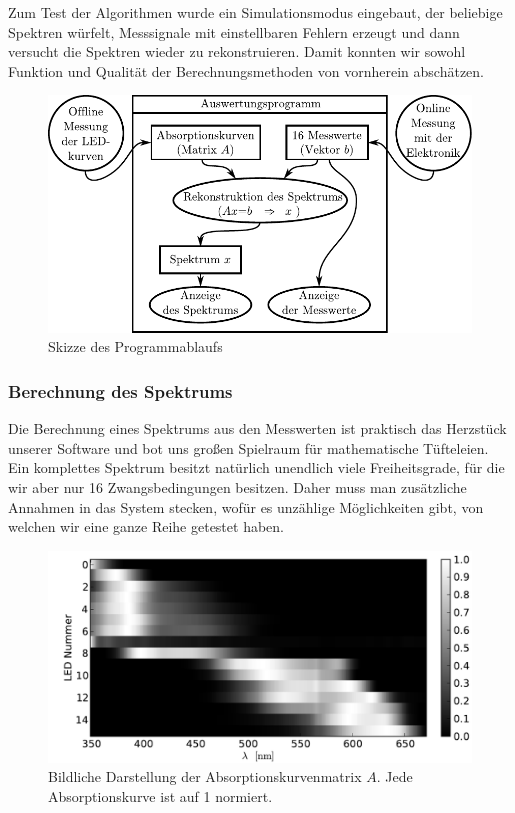 \documentclass[11pt]{scrartcl}
\begin{document}
Zum Test der Algorithmen wurde ein Simulationsmodus eingebaut, der beliebige Spektren würfelt, Messsignale mit einstellbaren Fehlern erzeugt und dann versucht die Spektren wieder zu rekonstruieren.
Damit konnten wir sowohl Funktion und Qualität der Berechnungsmethoden von vornherein abschätzen.
\begin{figure}[ht]
\begin{center}
\includegraphics[width=1\textwidth]{programmablauf.pdf}
\end{center}
\vspace{-1.5\baselineskip}
\caption{Skizze des Programmablaufs}
\label{fig:programmablauf}
\end{figure}


\subsubsection{Berechnung des Spektrums}
Die Berechnung eines Spektrums aus den Messwerten ist praktisch das Herzstück unserer Software und bot uns großen Spielraum für mathematische Tüfteleien.
Ein komplettes Spektrum besitzt natürlich unendlich viele Freiheitsgrade, für die wir aber nur 16 Zwangsbedingungen besitzen.
Daher muss man zusätzliche Annahmen in das System stecken, wofür es unzählige Möglichkeiten gibt, von welchen wir eine ganze Reihe getestet haben.
\begin{figure}[H]
\begin{center}
\includegraphics[width=1\textwidth]{matrix_A.pdf}
\end{center}
\vspace{-1.5\baselineskip}
\caption{Bildliche Darstellung der Absorptionskurvenmatrix $A$. Jede Absorptionskurve ist auf 1 normiert.}
\label{fig:matrixA}
\end{figure}
\end{document}

